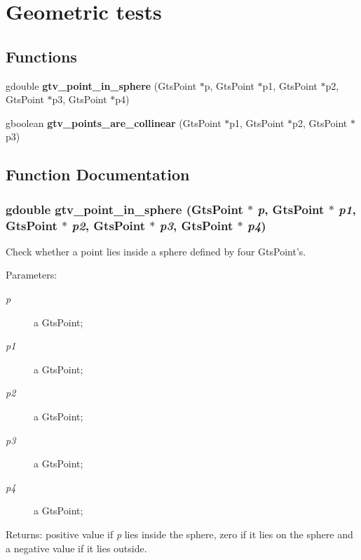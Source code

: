 \section{Geometric tests}
\label{group__geometry}
\subsection*{Functions}
\begin{CompactItemize}
\item 
gdouble {\bf gtv\_\-point\_\-in\_\-sphere} (GtsPoint $\ast$p, GtsPoint $\ast$p1, GtsPoint $\ast$p2, GtsPoint $\ast$p3, GtsPoint $\ast$p4)
\item 
gboolean {\bf gtv\_\-points\_\-are\_\-collinear} (GtsPoint $\ast$p1, GtsPoint $\ast$p2, GtsPoint $\ast$p3)
\end{CompactItemize}


\subsection{Function Documentation}
\subsubsection{\setlength{\rightskip}{0pt plus 5cm}gdouble gtv\_\-point\_\-in\_\-sphere (GtsPoint $\ast$ {\em p}, GtsPoint $\ast$ {\em p1}, GtsPoint $\ast$ {\em p2}, GtsPoint $\ast$ {\em p3}, GtsPoint $\ast$ {\em p4})}\label{group__geometry_g62ec1adc74fe75ce5ea29f7d3be1bb1d}


Check whether a point lies inside a sphere defined by four GtsPoint's.

\begin{Desc}
\item[Parameters:]
\begin{description}
\item[{\em p}]a GtsPoint; \item[{\em p1}]a GtsPoint; \item[{\em p2}]a GtsPoint; \item[{\em p3}]a GtsPoint; \item[{\em p4}]a GtsPoint;\end{description}
\end{Desc}
\begin{Desc}
\item[Returns:]positive value if {\em p\/} lies inside the sphere, zero if it lies on the sphere and a negative value if it lies outside. \end{Desc}
